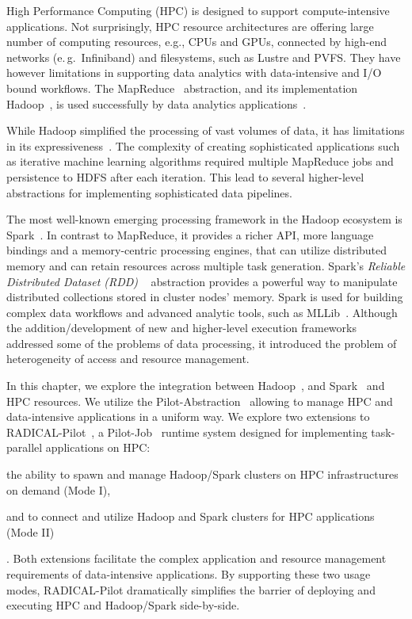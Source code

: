 \label{sec:pilot-data-hadoop}
High Performance Computing (HPC) is designed to support compute-intensive applications.
Not surprisingly, HPC resource architectures are offering large number of computing resources, e.g., CPUs and GPUs, connected by high-end networks (e.\,g.\ Infiniband) and filesystems, such as Lustre and PVFS.
They have however limitations in supporting data analytics with data-intensive and I/O bound workflows.
The MapReduce~\cite{dean2004mapreduce} abstraction, and its implementation Hadoop~\cite{hadoop}, is used successfully by data analytics applications~\cite{hellerstein2012science}.

While Hadoop simplified the processing of vast volumes of data, it has limitations in its expressiveness~\cite{yelick2011magellan,isard2007dryad}.
The complexity of creating sophisticated applications such as iterative machine learning algorithms required multiple MapReduce jobs and persistence to HDFS after each iteration.
This lead to several higher-level abstractions for implementing sophisticated data pipelines.

The most well-known emerging processing framework in the Hadoop ecosystem is Spark~\cite{zaharia2010spark}.
In contrast to MapReduce, it provides a richer API, more language bindings and a memory-centric processing engines, that can utilize distributed memory and can retain resources across multiple task generation.
Spark's \emph{Reliable Distributed Dataset (RDD)} ~\cite{zaharia2012resilient} abstraction provides a powerful way to manipulate distributed collections stored in cluster nodes' memory.
Spark is used for building complex data workflows and advanced analytic tools, such as MLLib~\cite{mllib}.
Although the addition/development of new and higher-level execution frameworks addressed some of the problems of data processing, it introduced the problem of heterogeneity of access and resource management.

In this chapter, we explore the integration between Hadoop~\cite{hadoop}, and Spark~\cite{zaharia2010spark} and HPC resources.
We utilize the Pilot-Abstraction~\cite{luckow2012pstar} allowing to manage HPC and data-intensive applications in a uniform way.
We explore two extensions to RADICAL-Pilot~\cite{merzky2018design}, a Pilot-Job~\cite{luckow2012pstar} runtime system designed for implementing task-parallel applications on HPC: 
\begin{inparaenum}[(i)]
    \item the ability to spawn and manage Hadoop/Spark clusters on HPC infrastructures on demand (Mode I),
    \item and to connect and utilize Hadoop and Spark clusters for HPC applications (Mode II)
\end{inparaenum}.
Both extensions facilitate the complex application and resource management requirements of data-intensive applications.
By supporting these two usage modes, RADICAL-Pilot dramatically simplifies the barrier of deploying and executing HPC and Hadoop/Spark side-by-side.

